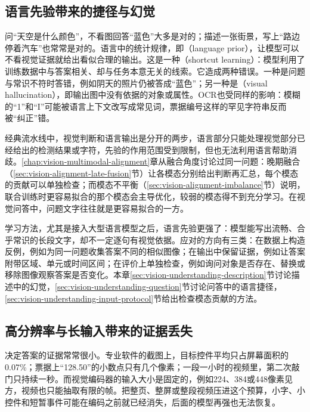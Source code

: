 \subsection{语言先验带来的捷径与幻觉}
\label{sec:vision-understanding-challenge-language-prior}

问“天空是什么颜色”，不看图回答“蓝色”大多是对的；描述一张街景，写上“路边停着汽车”也常常是对的。语言中的统计规律，即（language prior），让模型可以不看视觉证据就给出看似合理的输出。这是一种（shortcut learning）：模型利用了训练数据中与答案相关、却与任务本意无关的线索。它造成两种错误。一种是问题与常识不符时答错，例如阴天的照片仍被答成“蓝色”；另一种是（visual hallucination），即输出图中没有依据的对象或属性。OCR也受同样的影响：模糊的“1”和“I”可能被语言上下文改写成常见词，票据编号这样的罕见字符串反而被“纠正”错。

经典流水线中，视觉判断和语言输出是分开的两步，语言部分只能处理视觉部分已经给出的检测结果或字符，先验的作用范围受到限制，但也无法利用语言帮助消歧。\ref{chap:vision-multimodal-alignment}章从融合角度讨论过同一问题：晚期融合（\ref{sec:vision-alignment-late-fusion}节）让各模态分别给出判断再汇总，每个模态的贡献可以单独检查；而模态不平衡（\ref{sec:vision-alignment-imbalance}节）说明，联合训练时更容易拟合的那个模态会主导优化，较弱的模态得不到充分学习。在视觉问答中，问题文字往往就是更容易拟合的一方。

学习方法，尤其是接入大型语言模型之后，语言先验更强了：模型能写出流畅、合乎常识的长段文字，却不一定逐句有视觉依据。应对的方向有三类：在数据上构造反例，例如为同一问题收集答案不同的相似图像；在输出中保留证据，例如让答案附带区域、单元或时间区间；在评价上单独检查，例如询问对象是否存在、替换或移除图像观察答案是否变化。本章\ref{sec:vision-understanding-description}节讨论描述中的幻觉，\ref{sec:vision-understanding-question}节讨论问答中的语言捷径，\ref{sec:vision-understanding-input-protocol}节给出检查模态贡献的方法。

\subsection{高分辨率与长输入带来的证据丢失}
\label{sec:vision-understanding-challenge-resolution}

决定答案的证据常常很小。专业软件的截图上，目标控件平均只占屏幕面积的0.07\%；票据上“128.50”的小数点只有几个像素；一段一小时的视频里，第二次敲门只持续一秒。而视觉编码器的输入大小是固定的，例如224、384或448像素见方，视频也只能抽取有限的帧。把整页、整屏或整段视频压进这个预算，小字、小控件和短暂事件可能在编码之前就已经消失，后面的模型再强也无法恢复。

